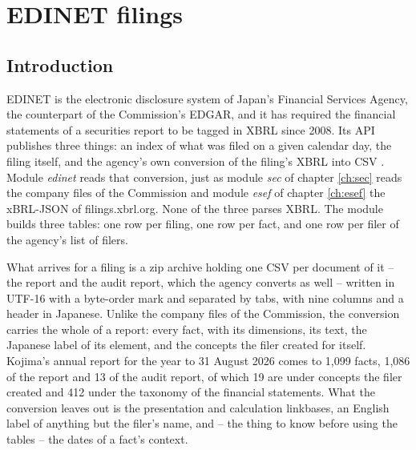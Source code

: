 \chapter{EDINET filings}\label{ch:edinet}

\section{Introduction}

EDINET is the electronic disclosure system of Japan's Financial Services Agency, the counterpart of the Commission's EDGAR, and it has required the financial statements of a securities report to be tagged in XBRL since 2008. Its API publishes three things: an index of what was filed on a given calendar day, the filing itself, and the agency's own conversion of the filing's XBRL into CSV \parencite{FSA.2026}. Module \emph{edinet} reads that conversion, just as module \emph{sec} of chapter \ref{ch:sec} reads the company files of the Commission and module \emph{esef} of chapter \ref{ch:esef} the xBRL-JSON of filings.xbrl.org. None of the three parses XBRL. The module builds three tables: one row per filing, one row per fact, and one row per filer of the agency's list of filers.

What arrives for a filing is a zip archive holding one CSV per document of it -- the report and the audit report, which the agency converts as well -- written in UTF-16 with a byte-order mark and separated by tabs, with nine columns and a header in Japanese. Unlike the company files of the Commission, the conversion carries the whole of a report: every fact, with its dimensions, its text, the Japanese label of its element, and the concepts the filer created for itself. Kojima's annual report for the year to 31 August 2026 comes to 1,099 facts, 1,086 of the report and 13 of the audit report, of which 19 are under concepts the filer created and 412 under the taxonomy of the financial statements. What the conversion leaves out is the presentation and calculation linkbases, an English label of anything but the filer's name, and -- the thing to know before using the tables -- the dates of a fact's context.

